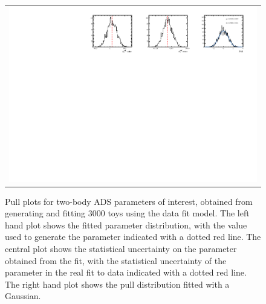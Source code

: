 \begin{figure}
\begin{tabular}{c}
\includegraphics[width=\textwidth]{ANA_resources/Plots/Data_fit/FitterBias//CombinedRuns//A_Bs_piK.pdf} \\
  \end{tabular}
  \caption{Pull plots for two-body ADS parameters of interest, obtained from generating and fitting 3000 toys using the data fit model. The left hand plot shows the fitted parameter distribution, with the value used to generate the parameter indicated with a dotted red line. The central plot shows the statistical uncertainty on the parameter obtained from the fit, with the statistical uncertainty of the parameter in the real fit to data indicated with a dotted red line. The right hand plot shows the pull distribution fitted with a Gaussian.}
\label{fig:twoBody_ADS/CombinedRuns/_pulls}
\end{figure}

